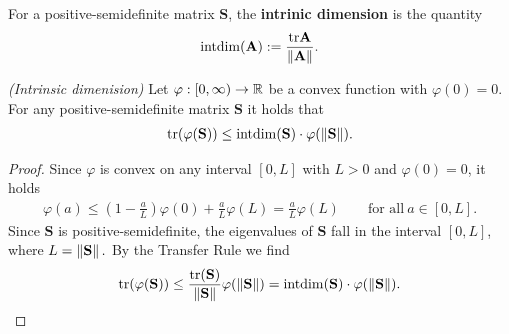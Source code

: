 \begin{definition}
  \label{rmineq_intrinsic_bernstein}
  For a positive-semidefinite matrix $\mathbf{S}$,
  the \textbf{intrinic dimension} is the quantity
  \begin{gather*}
    \mathrm{intdim}
    (\mathbf{A})
    :=
    \frac{\mathrm{tr}\mathbf{A}}{\left\lVert\mathbf{A}\right\rVert}
    .
  \end{gather*}
\end{definition}
\begin{lemma}
  \emph{(Intrinsic dimenision)}
  Let 
  $
    \varphi: [0,\infty) \to \mathbb{R}
  $
  be a convex function with
  $
    \varphi(0)=0.
  $
  For any positive-semidefinite matrix $\mathbf{S}$ it holds that
  \begin{gather*}
    \mathrm{tr}(\varphi(\mathbf{S}))
    \le
    \mathrm{intdim}(\mathbf{S})
    \cdot
    \varphi(\left\lVert\mathbf{S}\right\rVert)
    .
  \end{gather*}
\end{lemma}
\begin{proof}
  \emph{\cite[Lemma~7.5.1]{Tropp2015}}
  Since $\varphi$ is convex on any interval $[0,L]$ with $L>0$ and $\varphi(0)=0$, it holds
  \begin{gather}
    \varphi(a)
    \le
    \left( 
      1 - \frac{a}{L}
    \right)
    \varphi(0)
    +
    \frac{a}{L}
    \varphi(L)
    =
    \frac{a}{L}
    \varphi(L)
    \qquad
    \text{for all}\ 
    a \in [0,L]
    .
  \end{gather}
  Since $\mathbf{S}$ is positive-semidefinite, the eigenvalues of $\mathbf{S}$ 
  fall in the interval $[0,L]$, where $L=\left\lVert\mathbf{S}\right\rVert.$
  By the Transfer Rule we find
  \begin{gather}
    \mathrm{tr}(\varphi(\mathbf{S}))
    \le
    \frac{\mathrm{tr}(\mathbf{S})}{\left\lVert\mathbf{S}\right\rVert}
    \varphi(\left\lVert\mathbf{S}\right\rVert)
    =
    \mathrm{intdim}(\mathbf{S})
    \cdot
    \varphi(\left\lVert\mathbf{S}\right\rVert)
    .
  \end{gather}
\end{proof}
